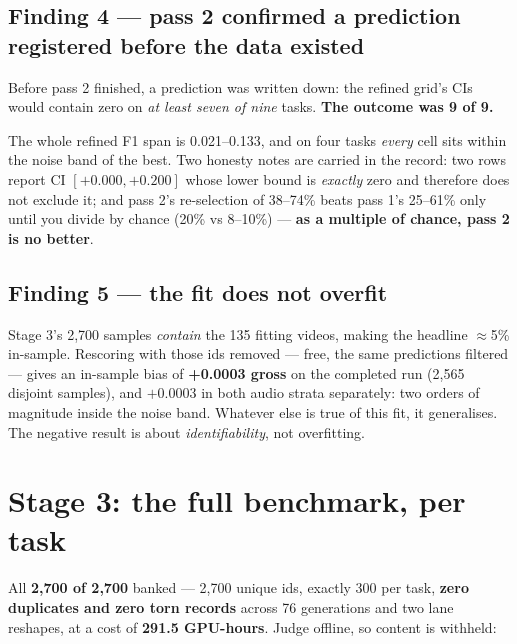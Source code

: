 \documentclass[11pt,a4paper]{article}
\begin{document}
\subsection{Finding 4 --- pass 2 confirmed a prediction registered before the data existed}

Before pass 2 finished, a prediction was written down: the refined grid's CIs would
contain zero on \emph{at least seven of nine} tasks. \textbf{The outcome was 9 of 9.}

The whole refined F1 span is 0.021--0.133, and on four tasks \emph{every} cell sits
within the noise band of the best. Two honesty notes are carried in the record: two
rows report CI $[+0.000,+0.200]$ whose lower bound is \emph{exactly} zero and
therefore does not exclude it; and pass 2's re-selection of 38--74\% beats pass 1's
25--61\% only until you divide by chance (20\% vs 8--10\%) --- \textbf{as a multiple
of chance, pass 2 is no better}.

\subsection{Finding 5 --- the fit does not overfit}

Stage 3's 2{,}700 samples \emph{contain} the 135 fitting videos, making the headline
$\approx$5\% in-sample. Rescoring with those ids removed --- free, the same
predictions filtered --- gives an in-sample bias of \textbf{+0.0003 gross} on the
completed run (2{,}565 disjoint samples), and $+$0.0003 in both audio strata
separately: two orders of magnitude inside the noise band. Whatever else is true of this fit, it
generalises. The negative result is about \emph{identifiability}, not overfitting.

\section{Stage 3: the full benchmark, per task}

All \textbf{2{,}700 of 2{,}700} banked --- 2{,}700 unique ids, exactly 300 per task,
\textbf{zero duplicates and zero torn records} across 76 generations and two lane
reshapes, at a cost of \textbf{291.5 GPU-hours}. Judge offline, so content is withheld:
\end{document}
